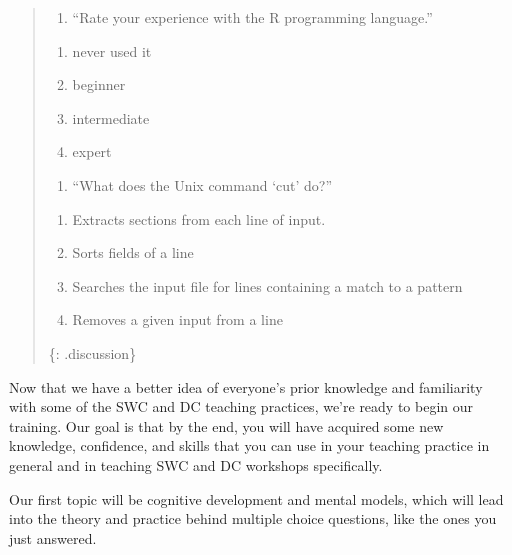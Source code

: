 \begin{quote}
\begin{enumerate}
\def\labelenumi{\arabic{enumi}.}
\setcounter{enumi}{2}
\itemsep1pt\parskip0pt
\item
  ``Rate your experience with the R programming language.''
\end{enumerate}

\begin{enumerate}
\def\labelenumi{(\alph{enumi})}
\itemsep1pt\parskip0pt
\item
  never used it
\item
  beginner
\item
  intermediate
\item
  expert
\end{enumerate}

\begin{enumerate}
\def\labelenumi{\arabic{enumi}.}
\setcounter{enumi}{3}
\itemsep1pt\parskip0pt
\item
  ``What does the Unix command `cut' do?''
\end{enumerate}

\begin{enumerate}
\def\labelenumi{(\alph{enumi})}
\itemsep1pt\parskip0pt
\item
  Extracts sections from each line of input.
\item
  Sorts fields of a line
\item
  Searches the input file for lines containing a match to a pattern
\item
  Removes a given input from a line
\end{enumerate}

\{: .discussion\}
\end{quote}

Now that we have a better idea of everyone's prior knowledge and
familiarity with some of the SWC and DC teaching practices, we're ready
to begin our training. Our goal is that by the end, you will have
acquired some new knowledge, confidence, and skills that you can use in
your teaching practice in general and in teaching SWC and DC workshops
specifically.

Our first topic will be cognitive development and mental models, which
will lead into the theory and practice behind multiple choice questions,
like the ones you just answered.
